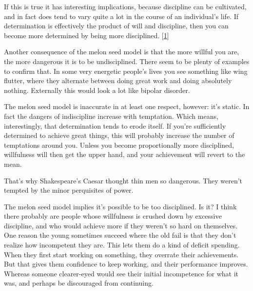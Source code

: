 If this is true it has interesting
                    implications, because discipline can be cultivated, and in
                    fact does tend to vary quite a lot in the course of an
                    individual's life. If determination is effectively the
                    product of will and discipline, then you can become more
                    determined by being more disciplined.
                    [\href{\#f1n}{1}]

Another consequence of the melon seed model is
                    that the more willful you are, the more dangerous it is to
                    be undisciplined. There seem to be plenty of examples to
                    confirm that. In some very energetic people's lives you see
                    something like wing flutter, where they alternate between
                    doing great work and doing absolutely nothing. Externally
                    this would look a lot like bipolar disorder.

The
                    melon seed model is inaccurate in at least one respect,
                    however: it's static. In fact the dangers of indiscipline
                    increase with temptation. Which means, interestingly, that
                    determination tends to erode itself. If you're sufficiently
                    determined to achieve great things, this will probably
                    increase the number of temptations around you. Unless you
                    become proportionally more disciplined, willfulness will
                    then get the upper hand, and your achievement will revert to
                    the mean.

That's why Shakespeare's Caesar thought
                    thin men so dangerous. They weren't tempted by the minor
                    perquisites of power.

The melon seed model
                    implies it's possible to be too disciplined. Is it? I think
                    there probably are people whose willfulness is crushed down
                    by excessive discipline, and who would achieve more if they
                    weren't so hard on themselves. One reason the young
                    sometimes succeed where the old fail is that they don't
                    realize how incompetent they are. This lets them do a kind
                    of deficit spending. When they first start working on
                    something, they overrate their achievements. But that gives
                    them confidence to keep working, and their performance
                    improves. Whereas someone clearer-eyed would see their
                    initial incompetence for what it was, and perhaps be
                    discouraged from continuing.

